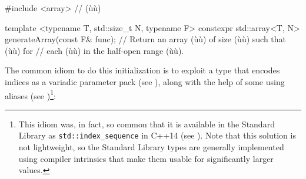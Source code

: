 \begin{emcppslisting}[emcppsbatch=e14]
#include <array>  // (ù{}ù)

template <typename T, std::size_t N, typename F>
constexpr std::array<T, N> generateArray(const F& func);
    // Return an array (ù{}ù) of size (ù{}ù) such that (ù{}ù) for
    // each (ù{}ù) in the half-open range (ù{\codeincomments{[0, N)}}ù).
\end{emcppslisting}
    

\noindent The common idiom to do this initialization is to exploit a type that
encodes indices as a variadic parameter pack (see ), along with the help of some using aliases (see
){\cprotect\footnote{This idiom
  was, in fact, so common that it is available in the Standard Library
  as \lstinline!std::index_sequence! in C++14 (see
  \cite{wakely13}). Note that this solution is not lightweight,
  so the Standard Library types are generally implemented using compiler
  intrinsics that make them usable for significantly larger values.}}:

